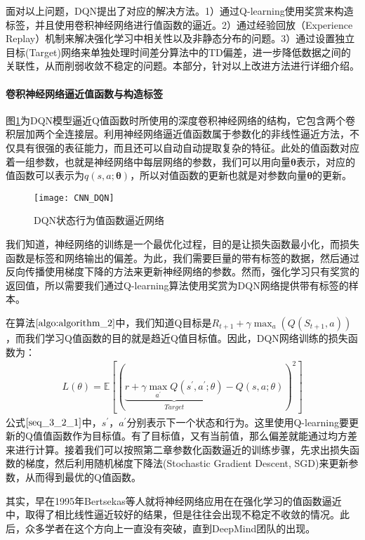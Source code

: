  面对以上问题，DQN提出了对应的解决方法。1）通过Q-learning使用奖赏来构造标签，并且使用卷积神经网络进行值函数的逼近。2）通过经验回放（Experience Replay）机制来解决强化学习中相关性以及非静态分布的问题。3）通过设置独立目标(Target)网络来单独处理时间差分算法中的TD偏差，进一步降低数据之间的关联性，从而削弱收敛不稳定的问题。本部分，针对以上改进方法进行详细介绍。

 \paragraph{卷积神经网络逼近值函数与构造标签}
图\ref{fig:CNN_DQN}为DQN模型逼近Q值函数时所使用的深度卷积神经网络的结构，它包含两个卷积层加两个全连接层。利用神经网络逼近值函数属于参数化的非线性逼近方法，不仅具有很强的表征能力，而且还可以自动自动提取复杂的特征。此处的值函数对应着一组参数，也就是神经网络中每层网络的参数，我们可以用向量$\mathbf{\theta}$表示，对应的值函数可以表示为$q(s,a;\mathbf{\theta})$，所以对值函数的更新也就是对参数向量$\mathbf{\theta}$的更新。
\begin{figure}[htbp]
\centering
\texttt{[image: CNN\_DQN]}
\caption{DQN状态行为值函数逼近网络}
\label{fig:CNN_DQN}
\end{figure}

我们知道，神经网络的训练是一个最优化过程，目的是让损失函数最小化，而损失函数是标签和网络输出的偏差。为此，我们需要巨量的带有标签的数据，然后通过反向传播使用梯度下降的方法来更新神经网络的参数。然而，强化学习只有奖赏的返回值，所以需要我们通过Q-learning算法使用奖赏为DQN网络提供带有标签的样本。

在算法$\ref{algo:algorithm_2}$中，我们知道Q目标是$R_{t+1}+\gamma \max_{a}(Q(S_{t+1},a))$，而我们学习Q值函数的目的就是趋近Q值目标值。因此，DQN网络训练的损失函数为：
\begin{equation}
\label{seq_3_2_1}
\begin{aligned}
L(\theta)=\mathbb{E}[(\underbrace{r+\gamma\max_{a^{'}} Q(s^{'},a^{'};\theta)}_{Target}-Q(s,a;\theta))^{2}]
\end{aligned}
\end{equation}
公式$\eqref{seq_3_2_1}$中，$s^{'}$，$a^{'}$分别表示下一个状态和行为。这里使用Q-learning要更新的Q值值函数作为目标值。有了目标值，又有当前值，那么偏差就能通过均方差来进行计算。接着我们可以按照第二章参数化函数逼近的训练步骤，先求出损失函数的梯度，然后利用随机梯度下降法(Stochastic Gradient Descent, SGD)来更新参数，从而得到最优的Q值函数。

其实，早在1995年Bertsekas等人就将神经网络应用在在强化学习的值函数逼近中，取得了相比线性逼近较好的结果，但是往往会出现不稳定不收敛的情况\citep{bertsekas1995neuro}。此后，众多学者在这个方向上一直没有突破，直到DeepMind团队的出现。

